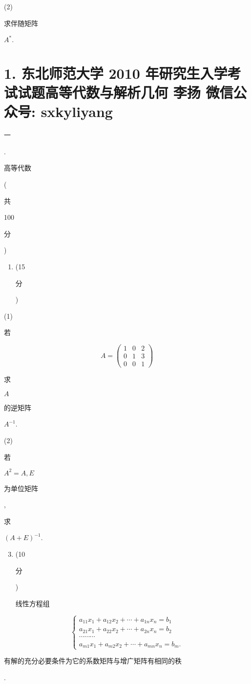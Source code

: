 \documentclass[10pt]{article}
\begin{document}
(2) \begin{CJK}{UTF8}{mj}求伴随矩阵\end{CJK} $A^{*}$.

\section{1. 东北师范大学 2010 年研究生入学考试试题高等代数与解析几何 
 李扬 
 微信公众号: sxkyliyang}
\begin{CJK}{UTF8}{mj}一\end{CJK}. \begin{CJK}{UTF8}{mj}高等代数\end{CJK} (\begin{CJK}{UTF8}{mj}共\end{CJK} 100 \begin{CJK}{UTF8}{mj}分\end{CJK})

\begin{enumerate}
  \item (15 \begin{CJK}{UTF8}{mj}分\end{CJK})
\end{enumerate}
(1) \begin{CJK}{UTF8}{mj}若\end{CJK}
$$
A=\left(\begin{array}{lll}
1 & 0 & 2 \\
0 & 1 & 3 \\
0 & 0 & 1
\end{array}\right)
$$
\begin{CJK}{UTF8}{mj}求\end{CJK} $A$ \begin{CJK}{UTF8}{mj}的逆矩阵\end{CJK} $A^{-1}$.

(2) \begin{CJK}{UTF8}{mj}若\end{CJK} $A^{2}=A, E$ \begin{CJK}{UTF8}{mj}为单位矩阵\end{CJK}, \begin{CJK}{UTF8}{mj}求\end{CJK} $(A+E)^{-1}$.

\begin{enumerate}
  \setcounter{enumi}{2}
  \item (10 \begin{CJK}{UTF8}{mj}分\end{CJK}) \begin{CJK}{UTF8}{mj}线性方程组\end{CJK}
\end{enumerate}
$$
\left\{\begin{array}{c}
a_{11} x_{1}+a_{12} x_{2}+\cdots+a_{1 n} x_{n}=b_{1} \\
a_{21} x_{1}+a_{22} x_{2}+\cdots+a_{2 n} x_{n}=b_{2} \\
\cdots \cdots \cdots \\
a_{m 1} x_{1}+a_{m 2} x_{2}+\cdots+a_{m n} x_{n}=b_{m} .
\end{array}\right.
$$
\begin{CJK}{UTF8}{mj}有解的充分必要条件为它的系数矩阵与增广矩阵有相同的秩\end{CJK}.
\end{document}
